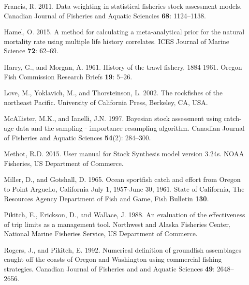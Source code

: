 \documentclass[12pt,]{article}
\begin{document}
\hypertarget{ref-Francis2011}{}
Francis, R. 2011. Data weighting in statistical fisheries stock
assessment models. Canadian Journal of Fisheries and Aquatic Sciencies
\textbf{68}: 1124--1138.

\hypertarget{ref-Hamel2015}{}
Hamel, O. 2015. A method for calculating a meta-analytical prior for the
natural mortality rate using multiple life history correlates. ICES
Journal of Marine Science \textbf{72}: 62--69.

\hypertarget{ref-Harry1961}{}
Harry, G., and Morgan, A. 1961. History of the trawl fishery, 1884-1961.
Oregon Fish Commission Research Briefs \textbf{19}: 5--26.

\hypertarget{ref-Love2002}{}
Love, M., Yoklavich, M., and Thorsteinson, L. 2002. The rockfishes of
the northeast Pacific. University of California Press, Berkeley, CA,
USA.

\hypertarget{ref-McAllister1997}{}
McAllister, M.K., and Ianelli, J.N. 1997. Bayesian stock assessment
using catch-age data and the sampling - importance resampling algorithm.
Canadian Journal of Fisheries and Aquatic Sciences \textbf{54}(2):
284--300.

\hypertarget{ref-Methot2015}{}
Methot, R.D. 2015. User manual for Stock Synthesis model version 3.24s.
NOAA Fisheries, US Department of Commerce.

\hypertarget{ref-Miller1965}{}
Miller, D., and Gotshall, D. 1965. Ocean sportfish catch and effort from
Oregon to Point Arguello, California July 1, 1957-June 30, 1961. State
of California, The Resources Agency Department of Fish and Game, Fish
Bulletin \textbf{130}.

\hypertarget{ref-Pikitch1988}{}
Pikitch, E., Erickson, D., and Wallace, J. 1988. An evaluation of the
effectiveness of trip limits as a management tool. Northwest and Alaska
Fisheries Center, National Marine Fisheries Service, US Department of
Commerce.

\hypertarget{ref-Rogers1992}{}
Rogers, J., and Pikitch, E. 1992. Numerical definition of groundfish
assemblages caught off the coasts of Oregon and Washington using
commercial fishing strategies. Canadian Journal of Fisheries and and
Aquatic Sciences \textbf{49}: 2648--2656.
\end{document}

